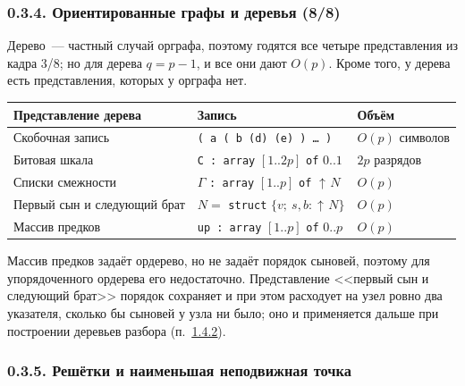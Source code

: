 \documentclass[mathserif,12pt,aspectratio=169]{beamer}
\def\Pointer{\operatorname{\uparrow\!}}
\def\DMref#1#2{{\color{blue}\underline{\hyperlink{#2}{#1}}}}
\begin{document}
\begin{frame}
\frametitle{0.3.4. Ориентированные графы и деревья (8/8)}

Дерево~--- частный случай орграфа, поэтому годятся все четыре представления из
кадра 3/8; но для дерева $q=p-1$, и все они дают $O(p)$. Кроме того, у дерева
есть представления, которых у орграфа нет.

\vspace{-2pt}
\begin{center}\scriptsize
\begin{tabular}{|l|l|l|}
\hline
Представление дерева & Запись & Объём \\
\hline
Скобочная запись & \texttt{( a ( b (d) (e) ) \dots\ )} & $O(p)$ символов \\
Битовая шкала & \texttt{C : array} $[1..2p]$ \texttt{of} $0..1$ & $2p$ разрядов \\
Списки смежности & $\Gamma$ \texttt{: array} $[1..p]$ \texttt{of} $\Pointer N$ &
$O(p)$ \\
Первый сын и следующий брат & $N=$ \texttt{struct} $\{v;\ s,b:\Pointer N\}$ &
$O(p)$ \\
Массив предков & \texttt{up : array} $[1..p]$ \texttt{of} $0..p$ & $O(p)$ \\
\hline
\end{tabular}
\end{center}
\vspace{-2pt}

\begin{remark}
Массив предков задаёт ордерево, но не задаёт порядок сыновей, поэтому для
упорядоченного ордерева его недостаточно. Представление <<первый сын и следующий
брат>> порядок сохраняет и при этом расходует на узел ровно два указателя, сколько
бы сыновей у узла ни было; оно и применяется дальше при построении деревьев
разбора (п.~\DMref{1.4.2}{1.4.2.}).
\end{remark}
\end{frame}



\subsubsection{0.3.5. Решётки и наименьшая неподвижная точка}\label{0.3.5.}
\end{document}
